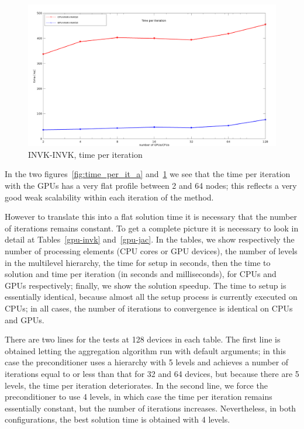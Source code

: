 \begin{figure}[h!]
\centering
\includegraphics[width=1\textwidth]{graf_time_per_it3b.png}
\caption{INVK-INVK, time per iteration\label{fig:time_per_it_b}}
\end{figure}

In the two figures~\ref{fig:time_per_it_a} and~\ref{fig:time_per_it_b}
we see that the time per iteration with the GPUs has a very flat profile between 2
and 64 nodes; this reflects a very good weak scalability within each
iteration of the method.

 However to translate this into a flat
solution time it is necessary that the number of iterations remains
constant. To get a complete picture it is necessary to look in detail
at  Tables~\ref{gpu-invk} and~\ref{gpu-jac}. In the tables, we show
respectively the number of processing elements (CPU cores or GPU
devices), the number of levels in the multilevel hierarchy, the time
for setup in seconds, then the time to solution and time per iteration
(in seconds and milliseconds), for CPUs and GPUs respectively; finally,
we show the solution speedup. The time 
to setup is essentially identical, because  almost all the
setup process is currently executed  on CPUs; in all cases, the number
of iterations to convergence is identical on CPUs and GPUs. 

There are two lines for the tests at 128 devices in each table. 
The first line is obtained letting the aggregation algorithm run with
default arguments; in this case the preconditioner uses a hierarchy
with 5 levels and achieves a number of iterations equal to or less than
that for 32 and 64 devices, but because there are 5 levels, the time
per iteration deteriorates.  In the second line, we force the
preconditioner to use 4 levels, in which case the time per iteration
remains essentially constant, but the number of iterations
increases. Nevertheless, in both configurations, the best solution
time is obtained with 4 levels. 

